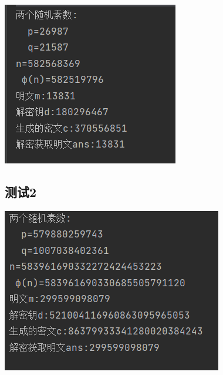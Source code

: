 \documentclass[UTF8,a4paper,10.5pt,twocolumn]{ctexart}
\begin{document}
\centerline{\includegraphics[scale=0.65]{测试1.png}} 

	\subsection{测试2}

\centerline{\includegraphics[scale=0.65]{测试2.png}} 
\end{document}
